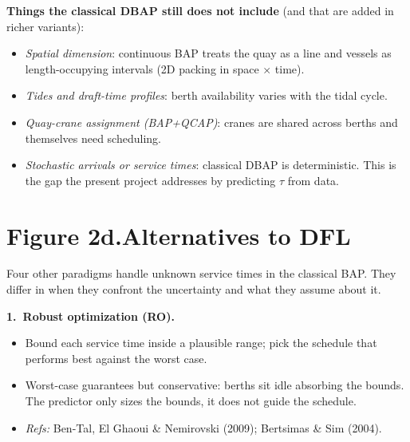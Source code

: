 \documentclass[11pt]{article}
\begin{document}
\vspace{0.4em}

\noindent\textbf{Things the classical DBAP still does not include}
(and that are added in richer variants):
\begin{itemize}[leftmargin=2em, itemsep=1pt]
  \item \emph{Spatial dimension}: continuous BAP treats the quay as a
        line and vessels as length-occupying intervals (2D packing in
        space $\times$ time).
  \item \emph{Tides and draft-time profiles}: berth availability
        varies with the tidal cycle.
  \item \emph{Quay-crane assignment (BAP+QCAP)}: cranes are shared
        across berths and themselves need scheduling.
  \item \emph{Stochastic arrivals or service times}: classical DBAP is
        deterministic. This is the gap the present project addresses
        by predicting $\tau$ from data.
\end{itemize}


\newpage

\section*{Figure 2d.\quad Alternatives to DFL}

\noindent
Four other paradigms handle unknown service times in the classical
BAP. They differ in when they confront the uncertainty and what they
assume about it.

\vspace{0.5em}

\noindent\textbf{1.\ Robust optimization (RO).}
\begin{itemize}[leftmargin=2em, itemsep=0pt]
  \item Bound each service time inside a plausible range; pick the
        schedule that performs best against the worst case.
  \item Worst-case guarantees but conservative: berths sit idle
        absorbing the bounds. The predictor only sizes the bounds, it
        does not guide the schedule.
  \item \emph{Refs:} Ben-Tal, El Ghaoui \& Nemirovski (2009);
        Bertsimas \& Sim (2004).
\end{itemize}
\end{document}
